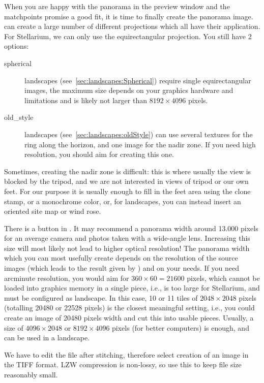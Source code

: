 When you are happy with the panorama in the preview window and the
matchpoints promise a good fit, it is time to finally create the
panorama image.  can create a large number of different
projections which all have their application. For Stellarium, we can
only use the equirectangular projection. You still have 2 options:

\begin{description}
\item[spherical] landscapes (see~\ref{sec:landscapes:Spherical}) require single equirectangular images, the
  maximum size depends on your graphics hardware and  limitations
  and is likely not larger than $8192\times4096$ pixels.
\item[old\_style] landscapes (see~\ref{sec:landscapes:oldStyle}) can use several textures for the ring
  along the horizon, and one image for the nadir zone. If you need
  high resolution, you should aim for creating this one.
\end{description}

Sometimes, creating the nadir zone is difficult: this is where usually
the view is blocked by the tripod, and we are not interested in views
of tripod or our own feet. For our purpose it is usually enough to
fill in the feet area using the clone stamp, or a monochrome color,
or, for  landscapes, you can instead insert an oriented site
map or wind rose.

There is a button  in . It may
recommend a panorama width around 13.000 pixels for an average camera
and photos taken with a wide-angle lens. Increasing this size will
most likely not lead to higher optical resolution!  The panorama width
which you can most usefully create depends on the resolution of the
source images (which leads to the result given by ) and on your
needs. If you need arcminute resolution, you would aim for
$360\times60=21600$ pixels, which cannot be loaded into graphics
memory in a single piece, i.e., is too large for Stellarium, and must
be configured as  landscape. In this case, 10 or 11 tiles of
$2048\times2048$ pixels (totalling 20480 or 22528 pixels) is the closest
meaningful setting, i.e., you could create an image of 20480 pixels
width and cut this into usable pieces. Usually, a size of
$4096\times2048$ or $8192\times4096$ pixels (for better computers) is
enough, and can be used in a  landscape.

We have to edit the file after stitching, therefore select creation of
an image in the TIFF format. LZW compression is non-lossy, so use this
to keep file size reasonably small.

